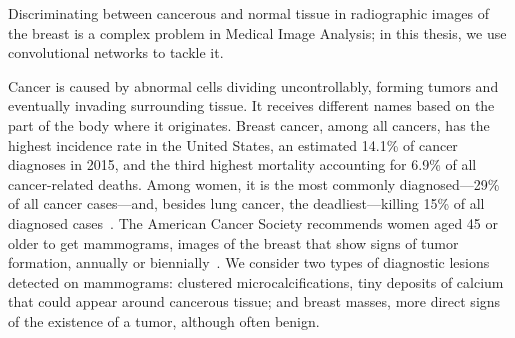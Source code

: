 
Discriminating between cancerous and normal tissue in radiographic images of the breast is a complex problem in Medical Image Analysis; in this thesis, we use convolutional networks to tackle it.

Cancer is caused by abnormal cells dividing uncontrollably, forming tumors and eventually invading surrounding tissue. It receives different names based on the part of the body where it originates. 
Breast cancer, among all cancers, has the highest incidence rate in the United States, an estimated 14.1\% of cancer diagnoses in 2015, and the third highest mortality accounting for 6.9\% of all cancer-related deaths. 
Among women, it is the most commonly diagnosed---29\% of all cancer cases---and, besides lung cancer, the deadliest---killing 15\% of all diagnosed cases~\cite{ACS2015}. The American Cancer Society recommends women aged 45 or older to get mammograms, images of the breast that show signs of tumor formation, annually or biennially~\cite{Oeffinger2015}. We consider two types of diagnostic lesions detected on mammograms: clustered microcalcifications, tiny deposits of calcium that could appear around cancerous tissue; and breast masses, more direct signs of the existence of a tumor, although often benign.


